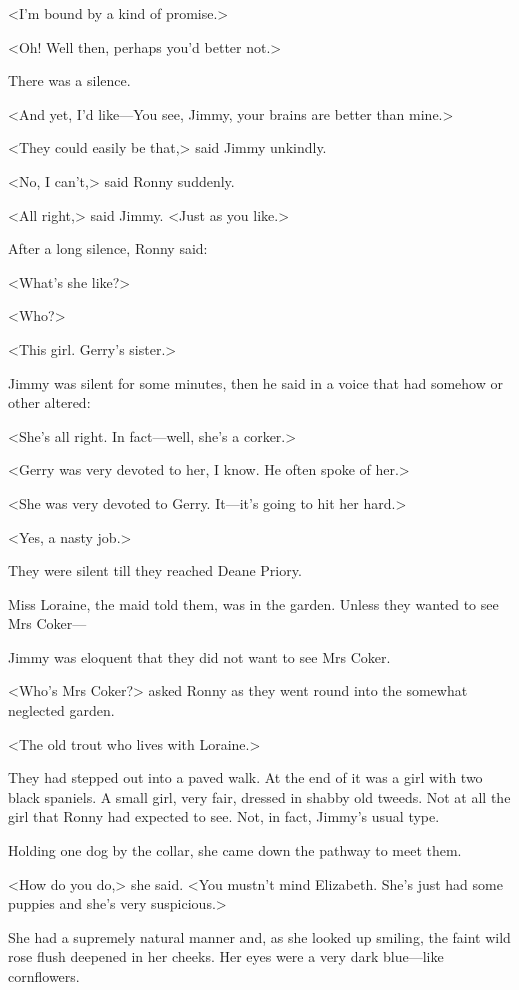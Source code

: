 <I'm bound by a kind of promise.>

<Oh! Well then, perhaps you'd better not.>

There was a silence.

<And yet, I'd like—You see, Jimmy, your brains are better than mine.>

<They could easily be that,> said Jimmy unkindly.

<No, I can't,> said Ronny suddenly.

<All right,> said Jimmy. <Just as you like.>

After a long silence, Ronny said:

<What's she like?>

<Who?>

<This girl. Gerry's sister.>

Jimmy was silent for some minutes, then he said in a voice that had somehow or other altered:

<She's all right. In fact—well, she's a corker.>

<Gerry was very devoted to her, I know. He often spoke of her.>

<She was very devoted to Gerry. It—it's going to hit her hard.>

<Yes, a nasty job.>

They were silent till they reached Deane Priory.

Miss Loraine, the maid told them, was in the garden. Unless they wanted to see Mrs Coker—

Jimmy was eloquent that they did not want to see Mrs Coker.

<Who's Mrs Coker?> asked Ronny as they went round into the somewhat neglected garden.

<The old trout who lives with Loraine.>

They had stepped out into a paved walk. At the end of it was a girl with two black spaniels. A small girl, very fair, dressed in shabby old tweeds. Not at all the girl that Ronny had expected to see. Not, in fact, Jimmy's usual type.

Holding one dog by the collar, she came down the pathway to meet them.

<How do you do,> she said. <You mustn't mind Elizabeth. She's just had some puppies and she's very suspicious.>

She had a supremely natural manner and, as she looked up smiling, the faint wild rose flush deepened in her cheeks. Her eyes were a very dark blue—like cornflowers.

